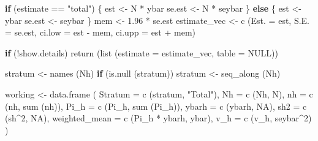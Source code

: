 \documentclass[
  letterpaper,
  DIV=11,
  numbers=noendperiod]{scrreprt}
\newenvironment{Shaded}{\begin{snugshade}}{\end{snugshade}}
\newcommand{\AttributeTok}[1]{\textcolor[rgb]{0.40,0.45,0.13}{#1}}
\newcommand{\ConstantTok}[1]{\textcolor[rgb]{0.56,0.35,0.01}{#1}}
\newcommand{\ControlFlowTok}[1]{\textcolor[rgb]{0.00,0.23,0.31}{\textbf{#1}}}
\newcommand{\DecValTok}[1]{\textcolor[rgb]{0.68,0.00,0.00}{#1}}
\newcommand{\FloatTok}[1]{\textcolor[rgb]{0.68,0.00,0.00}{#1}}
\newcommand{\FunctionTok}[1]{\textcolor[rgb]{0.28,0.35,0.67}{#1}}
\newcommand{\NormalTok}[1]{\textcolor[rgb]{0.00,0.23,0.31}{#1}}
\newcommand{\OtherTok}[1]{\textcolor[rgb]{0.00,0.23,0.31}{#1}}
\newcommand{\SpecialCharTok}[1]{\textcolor[rgb]{0.37,0.37,0.37}{#1}}
\newcommand{\StringTok}[1]{\textcolor[rgb]{0.13,0.47,0.30}{#1}}
\renewcommand{\[}{\begin{equation}}
\renewcommand{\]}{\end{equation}}
\begin{document}
\begin{Shaded}
\begin{Highlighting}[]
    \ControlFlowTok{if}\NormalTok{ (estimate }\SpecialCharTok{==} \StringTok{"total"}\NormalTok{)}
\NormalTok{    \{}
\NormalTok{        est    }\OtherTok{\textless{}{-}}\NormalTok{ N }\SpecialCharTok{*}\NormalTok{ ybar}
\NormalTok{        se.est }\OtherTok{\textless{}{-}}\NormalTok{ N }\SpecialCharTok{*}\NormalTok{ seybar}
\NormalTok{    \}}
    \ControlFlowTok{else}
\NormalTok{    \{}
\NormalTok{        est    }\OtherTok{\textless{}{-}}\NormalTok{ ybar}
\NormalTok{        se.est }\OtherTok{\textless{}{-}}\NormalTok{ seybar}
\NormalTok{    \}}
\NormalTok{    mem          }\OtherTok{\textless{}{-}} \FloatTok{1.96} \SpecialCharTok{*}\NormalTok{ se.est}
\NormalTok{    estimate\_vec }\OtherTok{\textless{}{-}} \FunctionTok{c}\NormalTok{ (}\AttributeTok{Est. =}\NormalTok{ est, }\AttributeTok{S.E. =}\NormalTok{ se.est, }\AttributeTok{ci.low =}\NormalTok{ est }\SpecialCharTok{{-}}\NormalTok{ mem, }\AttributeTok{ci.upp =}\NormalTok{ est }\SpecialCharTok{+}\NormalTok{ mem)}

    \ControlFlowTok{if}\NormalTok{ (}\SpecialCharTok{!}\NormalTok{show.details)}
        \FunctionTok{return}\NormalTok{ (}\FunctionTok{list}\NormalTok{ (}\AttributeTok{estimate =}\NormalTok{ estimate\_vec, }\AttributeTok{table =} \ConstantTok{NULL}\NormalTok{))}

\NormalTok{    stratum }\OtherTok{\textless{}{-}} \FunctionTok{names}\NormalTok{ (Nh)}
    \ControlFlowTok{if}\NormalTok{ (}\FunctionTok{is.null}\NormalTok{ (stratum)) stratum }\OtherTok{\textless{}{-}} \FunctionTok{seq\_along}\NormalTok{ (Nh)}

\NormalTok{    working }\OtherTok{\textless{}{-}} \FunctionTok{data.frame}\NormalTok{ (}
        \AttributeTok{Stratum       =} \FunctionTok{c}\NormalTok{ (stratum, }\StringTok{"Total"}\NormalTok{),}
        \AttributeTok{Nh            =} \FunctionTok{c}\NormalTok{ (Nh, N),}
        \AttributeTok{nh            =} \FunctionTok{c}\NormalTok{ (nh, }\FunctionTok{sum}\NormalTok{ (nh)),}
        \AttributeTok{Pi\_h          =} \FunctionTok{c}\NormalTok{ (Pi\_h, }\FunctionTok{sum}\NormalTok{ (Pi\_h)),}
        \AttributeTok{ybarh         =} \FunctionTok{c}\NormalTok{ (ybarh, }\ConstantTok{NA}\NormalTok{),}
        \AttributeTok{sh2           =} \FunctionTok{c}\NormalTok{ (sh}\SpecialCharTok{\^{}}\DecValTok{2}\NormalTok{, }\ConstantTok{NA}\NormalTok{),}
        \AttributeTok{weighted\_mean =} \FunctionTok{c}\NormalTok{ (Pi\_h }\SpecialCharTok{*}\NormalTok{ ybarh, ybar),}
        \AttributeTok{v\_h           =} \FunctionTok{c}\NormalTok{ (v\_h, seybar}\SpecialCharTok{\^{}}\DecValTok{2}\NormalTok{)}
\NormalTok{    )}


\end{Highlighting}
\end{Shaded}
\end{document}
